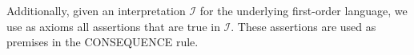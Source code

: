 \documentclass[runningheads]{llncs}       %
\begin{document}
Additionally, given an interpretation $\mathcal{I}$ for the underlying first-order language, 
we use as axioms all assertions that are true in $\mathcal{I}$. 
These assertions are used as premises in the CONSEQUENCE rule. 











\end{document}
